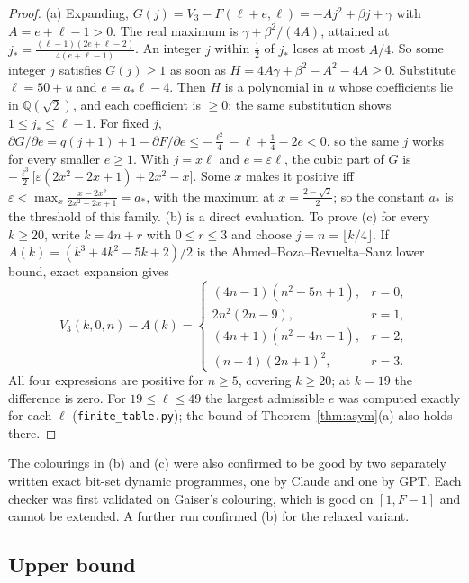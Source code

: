 \documentclass[11pt]{amsart}
\theoremstyle{definition}
\newcommand{\F}{F}
\begin{document}
\begin{proof}
(a) Expanding, $G(j)=V_3-\F(\ell+e,\ell)=-Aj^2+\beta j+\gamma$ with $A=e+\ell-1>0$. The real maximum is $\gamma+\beta^2/(4A)$, attained at $j_*=\frac{(\ell-1)(2e+\ell-2)}{4(e+\ell-1)}$. An integer $j$ within $\frac12$ of $j_*$ loses at most $A/4$. So some integer $j$ satisfies $G(j)\ge1$ as soon as $H=4A\gamma+\beta^2-A^2-4A\ge0$. Substitute $\ell=50+u$ and $e=a_*\ell-4$. Then $H$ is a polynomial in $u$ whose coefficients lie in $\mathbb Q(\sqrt2)$, and each coefficient is $\ge0$; the same substitution shows $1\le j_*\le\ell-1$. For fixed $j$, $\partial G/\partial e=q(j+1)+1-\partial\F/\partial e\le-\frac{\ell^2}{4}-\ell+\frac14-2e<0$, so the same $j$ works for every smaller $e\ge1$. With $j=x\ell$ and $e=\varepsilon\ell$, the cubic part of $G$ is $-\frac{\ell^3}{2}\bigl[\varepsilon(2x^2-2x+1)+2x^2-x\bigr]$. Some $x$ makes it positive iff $\varepsilon<\max_x\frac{x-2x^2}{2x^2-2x+1}=a_*$, with the maximum at $x=\frac{2-\sqrt2}{2}$; so the constant $a_*$ is the threshold of this family. (b) is a direct evaluation. To prove (c) for every $k\ge20$, write $k=4n+r$ with $0\le r\le3$ and choose $j=n=\lfloor k/4\rfloor$. If $A(k)=(k^3+4k^2-5k+2)/2$ is the Ahmed--Boza--Revuelta--Sanz lower bound, exact expansion gives
\[
V_3(k,0,n)-A(k)=
\begin{cases}
(4n-1)(n^2-5n+1),&r=0,\\
2n^2(2n-9),&r=1,\\
(4n+1)(n^2-4n-1),&r=2,\\
(n-4)(2n+1)^2,&r=3.
\end{cases}
\]
All four expressions are positive for $n\ge5$, covering $k\ge20$; at $k=19$ the difference is zero. For $19\le\ell\le49$ the largest admissible $e$ was computed exactly for each $\ell$ (\texttt{finite\_table.py}); the bound of Theorem~\ref{thm:asym}(a) also holds there.
\end{proof}

\noindent The colourings in (b) and (c) were also confirmed to be good by two separately written exact bit-set dynamic programmes, one by Claude and one by GPT. Each checker was first validated on Gaiser's colouring, which is good on $[1,\F-1]$ and cannot be extended. A further run confirmed (b) for the relaxed variant.

\subsection*{Upper bound}
\end{document}
